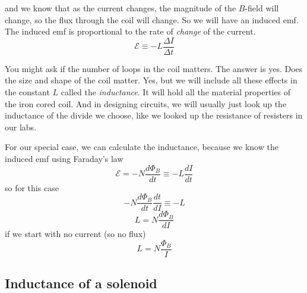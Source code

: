 and we know that as the current changes, the magnitude of the $B$-field will
change, so the flux through the coil will change. So we will have an induced
emf. The induced emf is proportional to the rate of \emph{change} of the
current.%
\begin{equation*}
\mathcal{E}\equiv -L\frac{\Delta I}{\Delta t}
\end{equation*}

You might ask if the number of loops in the coil matters. The answer is yes.
Does the size and shape of the coil matter. Yes, but we will include all
these effects in the constant $L$ called the \emph{inductance}. It will hold
all the material properties of the iron cored coil. And in designing
circuits, we will usually just look up the inductance of the divide we
choose, like we looked up the resistance of resisters in our labs.

For our special case, we can calculate the inductance, because we know the
induced emf using Faraday's law%
\begin{equation*}
\mathcal{E}=-N\frac{d\Phi _{B}}{dt}\equiv -L\frac{dI}{dt}
\end{equation*}%
so for this case%
\begin{equation*}
-N\frac{d\Phi _{B}}{dt}\frac{dt}{dI}\equiv -L
\end{equation*}%
\begin{equation*}
L=N\frac{d\Phi _{B}}{dI}
\end{equation*}%
if we start with no current (so no flux)%
\begin{equation*}
L=N\frac{\Phi _{B}}{I}
\end{equation*}

\subsection{Inductance of a solenoid}

